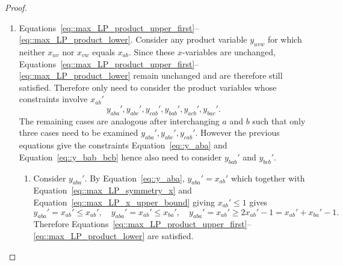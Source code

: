\begin{proof}
\begin{enumerate}[label=\Alph*.]
\begin{enumerate}[label=(\roman*)]
          \[
          1 \leq z_{bc}' = \sum_{k\in\{a,b,c\}}y_{bkc}'+x_{bc}' =y_{bac}'+y_{bbc}'+y_{bcc}'+x_{bc}'=y_{bac}'+x_{bc}',
          \]
          since Equations~\eqref{eq::max_LP_product_upper_first}--\eqref{eq::max_LP_product_upper_second} together with Equation~\eqref{eq::max_LP_diagonal_x} imply $y_{bbc}'=y_{bcc}'=0$. As $x_{bc}'=x_{bc}$, $y_{bac}' = y_{bac}$ satisfies the new equation, no additional constraints are needed. 
        \item Since $g_{ac}=0$, Equations~\eqref{eq::max_LP_indicator_upper}--\eqref{eq::max_LP_indicator_lower} imply $z_{ac}'=0$. Hence, by Equation~\eqref{eq::max_LP_indicator_arg},
          \[
          0=z_{ac}'=\sum_{k\in\{a,b,c\}}y_{akc}'+x_{ac}'=y_{aac}'+y_{abc}'+y_{acc}'+x_{ac}'=y_{abc}',
          \]
          since $y_{aac}'=y_{acc}'=0$ by Equations~\eqref{eq::max_LP_product_upper_first}--\eqref{eq::max_LP_product_upper_second}, and $x_{ac}'=0$ by Lemma~\ref{lemma::two_edges_linear_sum}. Therefore $y_{abc}'=y_{abc} = 0$ which is unchanged from the original feasible solution.  
      \end{enumerate}
    \item Equations~\eqref{eq::max_LP_product_upper_first}--\eqref{eq::max_LP_product_lower}. Consider any product variable $y_{uvw}$ for which neither $x_{uv}$ nor $x_{vw}$ equals $x_{ab}$. Since these $x$-variables are unchanged, Equations~\eqref{eq::max_LP_product_upper_first}--\eqref{eq::max_LP_product_lower} remain unchanged and are therefore still satisfied. Therefore only need to consider the product variables whose constraints involve $x_{ab}'$
    \[
    y_{aba}',y_{abc}',y_{cab}',y_{bab}',y_{acb}',y_{bac}'. 
    \]
    The remaining cases are analogous after interchanging $a$ and $b$ such that only three cases need to be examined $y_{aba}',y_{abc}',y_{cab}'$. However the previous equations give the constraints Equation~\eqref{eq::y_aba} and Equation~\eqref{eq::y_bab_bcb} hence also need to consider $y_{bab}'$ and $y_{bcb}'$. 
      \begin{enumerate}[label=(\roman*)]
        \item Consider $y_{aba}'$. By Equation~\eqref{eq::y_aba}, $y_{aba}'=x_{ab}'$ which together with Equation~\eqref{eq::max_LP_symmetry_x} and Equation~\eqref{eq::max_LP_x_upper_bound} giving $x_{ab}' \leq 1$ gives
          \[
          y_{aba}'=x_{ab}' \leq x_{ab}',\quad y_{aba}'=x_{ab}'\leq x_{ba}', \quad y_{aba}'=x_{ab}' \geq 2x_{ab}'-1 =x_{ab}'+x_{ba}'-1. 
          \]
          Therefore Equations~\eqref{eq::max_LP_product_upper_first}--\eqref{eq::max_LP_product_lower} are satisfied.

\end{enumerate}
\end{enumerate}
\end{proof}
